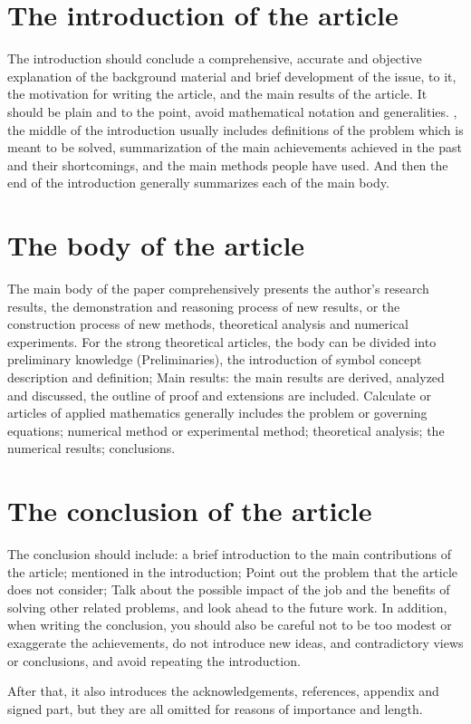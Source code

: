 \section{The introduction of the article}
The introduction should conclude a comprehensive, accurate and objective explanation of the background material and  brief development of the issue,  to it, the motivation for writing the article, and the main results of the article. It should be plain and to the point, avoid mathematical notation and generalities. , the middle of the introduction usually includes definitions of the problem which is meant to be solved, summarization of the main achievements achieved in the past and their shortcomings, and the main methods people have used. And then the end of the introduction generally summarizes each  of the main body.

\section{The body of the article}
The main body of the paper comprehensively presents the author's research results, the demonstration and reasoning process of new results, or the construction process of new methods, theoretical analysis and numerical experiments. For the strong theoretical articles, the body can be divided into preliminary knowledge (Preliminaries), the introduction of symbol concept description and definition; Main results: the main results are derived, analyzed and discussed,  the outline of proof and extensions are included. Calculate or articles of applied mathematics generally includes the problem or governing equations; numerical method or experimental method; theoretical analysis; the numerical results;  conclusions.

\section{The conclusion of the article}
The conclusion should include: a brief introduction to the main contributions of the article;  mentioned in the introduction; Point out the problem that the article does not consider; Talk about the possible impact of the job and the benefits of solving other related problems, and look ahead to the future work. In addition, when writing the conclusion, you should also be careful not to be too modest or exaggerate the achievements, do not introduce new ideas,  and contradictory views or conclusions, and avoid repeating the introduction.

After that, it also introduces the acknowledgements, references, appendix and signed part, but they are all omitted for reasons of importance and length.
